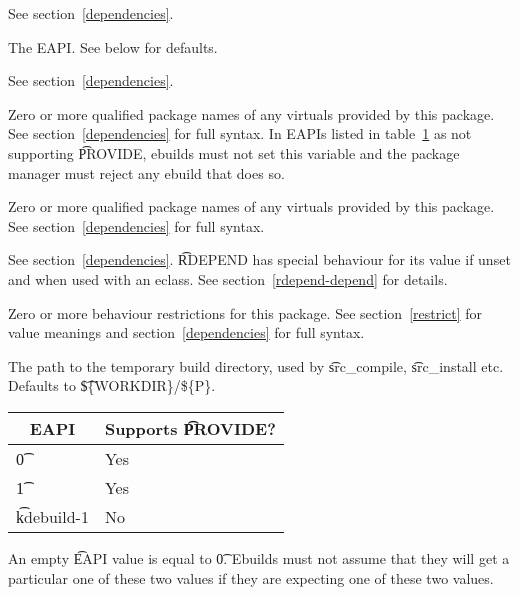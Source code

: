 \begin{description}
\item[DEPEND] See section~\ref{dependencies}.
\item[EAPI] The EAPI. See below for defaults.
\item[PDEPEND] See section~\ref{dependencies}.
\IFKDEBUILDELSE
{
    \item[PROVIDE] Zero or more qualified package names of any 
        virtuals provided by this package. See section~\ref{dependencies} for full syntax.  In EAPIs
        listed in table~\ref{provide-table} as not supporting \t{PROVIDE}, ebuilds must not set this
        variable and the package manager must reject any ebuild that does so.
        \label{ebuild-var-provide}
}{
    \item[PROVIDE] Zero or more qualified package names of any 
        virtuals provided by this package. See section~\ref{dependencies} for full syntax.
        \label{ebuild-var-provide}
}
\item[RDEPEND] See section~\ref{dependencies}. \t{RDEPEND} has special behaviour for its value if
    unset and when used with an eclass. See section~\ref{rdepend-depend} for details.
\item[RESTRICT] Zero or more behaviour restrictions for this package. See section~\ref{restrict}
    for value meanings and section~\ref{dependencies} for full syntax.
\item[S] The path to the temporary build directory, used by \t{src\_compile}, \t{src\_install}
    etc. Defaults to \t{\$\{WORKDIR\}/\$\{P\}}.
\end{description}

\IFKDEBUILDELSE
{
    \begin{table}
    \centering
     \label{provide-table}
    \begin{tabular}{ l l }
        \toprule
        \multicolumn{1}{c}{\textbf{EAPI}} &
        \multicolumn{1}{c}{\textbf{Supports \t{PROVIDE}?}} \\
        \midrule
    \t{0} & Yes \\
    \t{1} & Yes \\
    \t{kdebuild-1} & No \\
    \bottomrule
    \end{tabular}
    \end{table}
}{
}

An empty \t{EAPI} value is equal to \t{0}. Ebuilds must not assume that they will get a particular
one of these two values if they are expecting one of these two values.

